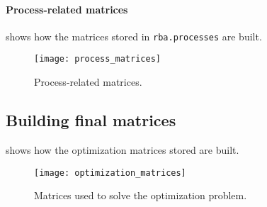 \paragraph{Process-related matrices}  shows how the matrices stored in \texttt{rba.processes} are built.
\begin{figure}[ht]
  \centering
  \texttt{[image: process\_matrices]}
  \caption{Process-related matrices.}
  \label{fig:process_matrices}
\end{figure}

\subsection{Building final matrices}  shows how the optimization matrices stored are built.
\begin{figure}[ht]
  \centering
  \texttt{[image: optimization\_matrices]}
  \caption{Matrices used to solve the optimization problem.}
  \label{fig:optimization_matrices}
\end{figure}

